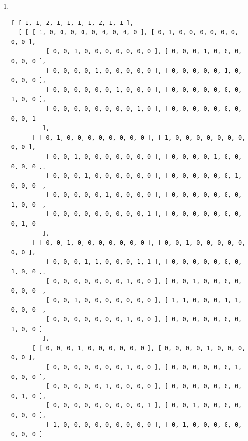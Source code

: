 \documentclass[a4paper, 10pt]{book}
\theoremstyle{definition}
\numberwithin{equation}{chapter}
\begin{document}
\begin{appendices}
\begin{enumerate}
\begin{lstlisting}[numbers=none]
         ], 
      [ [ 0, 0, 0, 0, 0, 0, 0, 0, 1, 0 ], [ 0, 0, 0, 0, 0, 0, 1, 0, 0, 0 ], 
          [ 0, 0, 0, 0, 0, 0, 0, 0, 0, 1 ], [ 0, 0, 0, 0, 0, 0, 0, 1, 0, 0 ],
          [ 0, 0, 0, 0, 0, 1, 0, 0, 0, 0 ], [ 0, 0, 0, 0, 1, 0, 0, 0, 0, 0 ],
          [ 0, 1, 0, 0, 0, 0, 0, 0, 0, 0 ], [ 0, 0, 0, 1, 0, 0, 0, 0, 0, 0 ],
          [ 1, 0, 0, 0, 0, 0, 0, 0, 0, 0 ], [ 0, 0, 1, 0, 0, 0, 0, 0, 0, 0 ] 
         ], 
      [ [ 0, 0, 0, 0, 0, 0, 0, 0, 0, 1 ], [ 0, 0, 0, 0, 0, 0, 0, 1, 0, 0 ], 
          [ 0, 0, 0, 0, 0, 0, 0, 0, 1, 0 ], [ 0, 0, 0, 0, 0, 0, 1, 0, 0, 0 ],
          [ 0, 0, 0, 0, 1, 0, 0, 0, 0, 0 ], [ 0, 0, 0, 0, 0, 1, 0, 0, 0, 0 ],
          [ 0, 0, 0, 1, 0, 0, 0, 0, 0, 0 ], [ 0, 1, 0, 0, 0, 0, 0, 0, 0, 0 ],
          [ 0, 0, 1, 0, 0, 0, 0, 0, 0, 0 ], [ 1, 0, 0, 0, 0, 0, 0, 0, 0, 0 ] 
         ] ] ]
	\end{lstlisting}
	\item -\begin{lstlisting}[numbers=none]
	[ [ 1, 1, 2, 1, 1, 1, 1, 2, 1, 1 ], 
  [ [ [ 1, 0, 0, 0, 0, 0, 0, 0, 0, 0 ], [ 0, 1, 0, 0, 0, 0, 0, 0, 0, 0 ], 
          [ 0, 0, 1, 0, 0, 0, 0, 0, 0, 0 ], [ 0, 0, 0, 1, 0, 0, 0, 0, 0, 0 ],
          [ 0, 0, 0, 0, 1, 0, 0, 0, 0, 0 ], [ 0, 0, 0, 0, 0, 1, 0, 0, 0, 0 ],
          [ 0, 0, 0, 0, 0, 0, 1, 0, 0, 0 ], [ 0, 0, 0, 0, 0, 0, 0, 1, 0, 0 ],
          [ 0, 0, 0, 0, 0, 0, 0, 0, 1, 0 ], [ 0, 0, 0, 0, 0, 0, 0, 0, 0, 1 ] 
         ], 
      [ [ 0, 1, 0, 0, 0, 0, 0, 0, 0, 0 ], [ 1, 0, 0, 0, 0, 0, 0, 0, 0, 0 ], 
          [ 0, 0, 1, 0, 0, 0, 0, 0, 0, 0 ], [ 0, 0, 0, 0, 1, 0, 0, 0, 0, 0 ],
          [ 0, 0, 0, 1, 0, 0, 0, 0, 0, 0 ], [ 0, 0, 0, 0, 0, 0, 1, 0, 0, 0 ],
          [ 0, 0, 0, 0, 0, 1, 0, 0, 0, 0 ], [ 0, 0, 0, 0, 0, 0, 0, 1, 0, 0 ],
          [ 0, 0, 0, 0, 0, 0, 0, 0, 0, 1 ], [ 0, 0, 0, 0, 0, 0, 0, 0, 1, 0 ] 
         ], 
      [ [ 0, 0, 1, 0, 0, 0, 0, 0, 0, 0 ], [ 0, 0, 1, 0, 0, 0, 0, 0, 0, 0 ], 
          [ 0, 0, 0, 1, 1, 0, 0, 0, 1, 1 ], [ 0, 0, 0, 0, 0, 0, 0, 1, 0, 0 ],
          [ 0, 0, 0, 0, 0, 0, 0, 1, 0, 0 ], [ 0, 0, 1, 0, 0, 0, 0, 0, 0, 0 ],
          [ 0, 0, 1, 0, 0, 0, 0, 0, 0, 0 ], [ 1, 1, 0, 0, 0, 1, 1, 0, 0, 0 ],
          [ 0, 0, 0, 0, 0, 0, 0, 1, 0, 0 ], [ 0, 0, 0, 0, 0, 0, 0, 1, 0, 0 ] 
         ], 
      [ [ 0, 0, 0, 1, 0, 0, 0, 0, 0, 0 ], [ 0, 0, 0, 0, 1, 0, 0, 0, 0, 0 ], 
          [ 0, 0, 0, 0, 0, 0, 0, 1, 0, 0 ], [ 0, 0, 0, 0, 0, 0, 1, 0, 0, 0 ],
          [ 0, 0, 0, 0, 0, 1, 0, 0, 0, 0 ], [ 0, 0, 0, 0, 0, 0, 0, 0, 1, 0 ],
          [ 0, 0, 0, 0, 0, 0, 0, 0, 0, 1 ], [ 0, 0, 1, 0, 0, 0, 0, 0, 0, 0 ],
          [ 1, 0, 0, 0, 0, 0, 0, 0, 0, 0 ], [ 0, 1, 0, 0, 0, 0, 0, 0, 0, 0 ] 

\end{lstlisting}
\end{enumerate}
\end{appendices}
\end{document}
